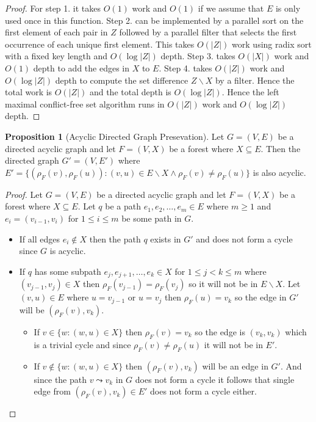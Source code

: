 \documentclass[a4paper,12pt]{article}
\theoremstyle{definition}
\newtheorem{proposition}{Proposition}[section]
\begin{document}
\begin{proof}
    For step 1. it takes $O(1)$ work and $O(1)$ if we assume that $E$ is only
    used once in this function. Step 2. can be implemented by a parallel sort on
    the first element of each pair in $Z$ followed by a parallel filter that
    selects the first occurrence of each unique first element. This takes
    $O(|Z|)$ work using radix sort with a fixed key length and $O(\log |Z|)$
    depth. Step 3. takes $O(|X|)$ work and $O(1)$ depth to add the edges in $X$
    to $E$. Step 4. takes $O(|Z|)$ work and $O(\log |Z|)$ depth to compute the
    set difference $Z \backslash X$ by a filter. Hence the total work is
    $O(|Z|)$ and the total depth is $O(\log |Z|)$. Hence the left maximal
    conflict-free set algorithm runs in $O(|Z|)$ work and $O(\log |Z|)$ depth.
\end{proof}


\begin{proposition}[Acyclic Directed Graph Presevation]\label{prop:acyclic-directed-graph-preservation}
    Let $G = (V, E)$ be a directed acyclic graph and let $F = (V, X)$ be a
    forest where $X \subseteq E$. Then the directed graph $G' = (V, E')$ where
    $E' = \{(\rho_F(v), \rho_F(u)) : (v, u) \in E \backslash X \land \rho_F(v)
    \neq \rho_F(u)\}$ is also acyclic.
\end{proposition}
\begin{proof}
    Let $G = (V, E)$ be a directed acyclic graph and let $F = (V, X)$ be a
    forest where $X \subseteq E$. Let $q$ be a path $e_1, e_2, \ldots, e_m \in
    E$ where $m \geq 1$ and $e_i = (v_{i-1}, v_i)$ for $1 \leq i \leq m$ be some
    path in $G$.
    \begin{itemize}
        \item If all edges $e_i \notin X$ then the path $q$ exists in $G'$ and
        does not form a cycle since $G$ is acyclic.
        \item If $q$ has some subpath $e_j, e_{j+1}, \ldots, e_k \in X$ for $1
        \leq j < k \leq m$ where $(v_{j - 1}, v_j) \in X$ then $\rho_F(v_{j-1})
        = \rho_F(v_{j})$ so it will not be in $E \backslash X$. Let $(v, u) \in
        E$ where $u  = v_{j - 1}$ or $u = v_j$ then $\rho_F(u) = v_k$ so the
        edge in $G'$ will be $(\rho_F(v), v_k)$.
        \begin{itemize}
            \item If $v \in \{w : (w, u) \in X\}$ then $\rho_F(v) = v_k$ so the
            edge is $(v_k, v_k)$ which is a trivial cycle and since $\rho_F(v)
            \neq \rho_F(u)$ it will not be in $E'$.
            \item If $v \notin \{w : (w, u) \in X\}$ then $(\rho_F(v), v_k)$
            will be an edge in $G'$. And since the path $v \leadsto v_k$ in $G$
            does not form a cycle it follows that single edge from $(\rho_F(v),
            v_k) \in E'$ does not form a cycle either.
        \end{itemize}
    \end{itemize}
\end{proof}
\end{document}
